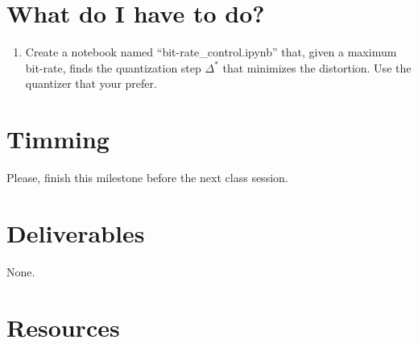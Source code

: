 

\section{What do I have to do?}

\begin{enumerate}
\item Create a notebook named ``bit-rate\_control.ipynb'' that, given
  a maximum bit-rate, finds the quantization step $\Delta^*$ that
  minimizes the distortion. Use the quantizer that your prefer.
\end{enumerate}


\section{Timming}

Please, finish this milestone before the next class session.

\section{Deliverables}

None.

\section{Resources}

\renewcommand{\addcontentsline}[3]{} %

